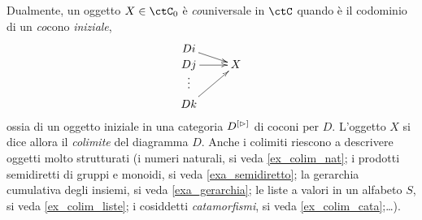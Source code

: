Dualmente, un oggetto \(X\in\ctC_0\) è \emph{co}universale in \(\ctC\) quando è il codominio di un \emph{co}cono \emph{iniziale},
\begin{equation}\label{cocone}\vcenter{\xymatrix@R=0mm{
 Di \ar@{->}[rd] &  \\
 Dj \ar@{->}[r] & X \\
 \vdots &  \\
 Dk \ar@{->}[ruu] &
 }}\end{equation}
ossia di un oggetto iniziale in una categoria ${D}^{[\rhd]}$ di coconi per \(D\). L'oggetto \(X\) si dice allora il \emph{colimite} del diagramma \(D\). Anche i colimiti riescono a descrivere oggetti molto strutturati (i numeri naturali, si veda \ref{ex_colim_nat}; i prodotti semidiretti di gruppi e monoidi, si veda \ref{exa_semidiretto}; la gerarchia cumulativa degli insiemi, si veda \ref{exa_gerarchia}; le liste a valori in un alfabeto \(S\), si veda \ref{ex_colim_liste}; i cosiddetti \emph{catamorfismi}, si veda \ref{ex_colim_cata};\dots).
